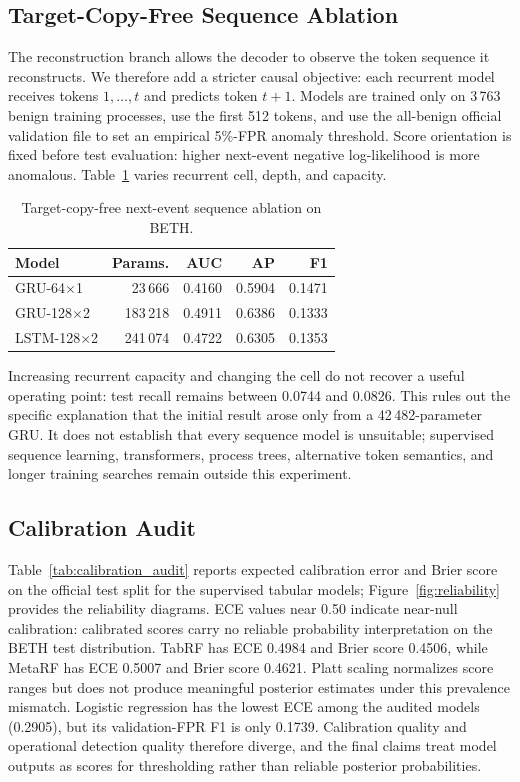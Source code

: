 \documentclass[10pt,journal,compsoc]{IEEEtran}
\begin{document}
\subsection{Target-Copy-Free Sequence Ablation}
\label{sec:sequence_ablation}

The reconstruction branch allows the decoder to observe the token sequence it reconstructs. We therefore add a stricter causal objective: each recurrent model receives tokens $1,\ldots,t$ and predicts token $t+1$. Models are trained only on 3\,763 benign training processes, use the first 512 tokens, and use the all-benign official validation file to set an empirical 5\%-FPR anomaly threshold. Score orientation is fixed before test evaluation: higher next-event negative log-likelihood is more anomalous. Table~\ref{tab:sequence_ablation} varies recurrent cell, depth, and capacity.

\begin{table}[t]
\centering
\caption{Target-copy-free next-event sequence ablation on BETH.}
\label{tab:sequence_ablation}
\begin{tabular}{lrrrr}
\toprule
\textbf{Model} & \textbf{Params.} & \textbf{AUC} & \textbf{AP} & \textbf{F1} \\
\midrule
GRU-64$\times$1 & 23\,666 & 0.4160 & 0.5904 & 0.1471 \\
GRU-128$\times$2 & 183\,218 & 0.4911 & 0.6386 & 0.1333 \\
LSTM-128$\times$2 & 241\,074 & 0.4722 & 0.6305 & 0.1353 \\
\bottomrule
\end{tabular}
\end{table}

Increasing recurrent capacity and changing the cell do not recover a useful operating point: test recall remains between 0.0744 and 0.0826. This rules out the specific explanation that the initial result arose only from a 42\,482-parameter GRU. It does not establish that every sequence model is unsuitable; supervised sequence learning, transformers, process trees, alternative token semantics, and longer training searches remain outside this experiment.

\subsection{Calibration Audit}

Table~\ref{tab:calibration_audit} reports expected calibration error and Brier score on the official test split for the supervised tabular models; Figure~\ref{fig:reliability} provides the reliability diagrams. ECE values near 0.50 indicate near-null calibration: calibrated scores carry no reliable probability interpretation on the BETH test distribution. TabRF has ECE 0.4984 and Brier score 0.4506, while MetaRF has ECE 0.5007 and Brier score 0.4621. Platt scaling normalizes score ranges but does not produce meaningful posterior estimates under this prevalence mismatch. Logistic regression has the lowest ECE among the audited models (0.2905), but its validation-FPR F1 is only 0.1739. Calibration quality and operational detection quality therefore diverge, and the final claims treat model outputs as scores for thresholding rather than reliable posterior probabilities.
\end{document}
